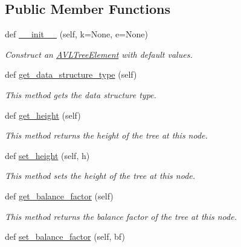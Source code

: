 \subsection*{Public Member Functions}
\begin{DoxyCompactItemize}
\item 
def \mbox{\hyperlink{class_bridges_1_1_a_v_l_tree_element_1_1_a_v_l_tree_element_abe1f188885a526cdaca8eb37d51ca8eb}{\+\_\+\+\_\+init\+\_\+\+\_\+}} (self, k=None, e=None)
\begin{DoxyCompactList}\small\item\em Construct an \mbox{\hyperlink{class_bridges_1_1_a_v_l_tree_element_1_1_a_v_l_tree_element}{A\+V\+L\+Tree\+Element}} with default values. \end{DoxyCompactList}\item 
def \mbox{\hyperlink{class_bridges_1_1_a_v_l_tree_element_1_1_a_v_l_tree_element_a8c53ad7f411645861da9c3d76b5c2a40}{get\+\_\+data\+\_\+structure\+\_\+type}} (self)
\begin{DoxyCompactList}\small\item\em This method gets the data structure type. \end{DoxyCompactList}\item 
def \mbox{\hyperlink{class_bridges_1_1_a_v_l_tree_element_1_1_a_v_l_tree_element_a4c59f5959ed7abd802a80da87322876c}{get\+\_\+height}} (self)
\begin{DoxyCompactList}\small\item\em This method returns the height of the tree at this node. \end{DoxyCompactList}\item 
def \mbox{\hyperlink{class_bridges_1_1_a_v_l_tree_element_1_1_a_v_l_tree_element_a8740bb85a71752e5376873a757d7cb29}{set\+\_\+height}} (self, h)
\begin{DoxyCompactList}\small\item\em This method sets the height of the tree at this node. \end{DoxyCompactList}\item 
def \mbox{\hyperlink{class_bridges_1_1_a_v_l_tree_element_1_1_a_v_l_tree_element_a439aa078880cb15c16fc87be59522947}{get\+\_\+balance\+\_\+factor}} (self)
\begin{DoxyCompactList}\small\item\em This method returns the balance factor of the tree at this node. \end{DoxyCompactList}\item 
def \mbox{\hyperlink{class_bridges_1_1_a_v_l_tree_element_1_1_a_v_l_tree_element_a2c7e78e317705dd02f66438f01acbb39}{set\+\_\+balance\+\_\+factor}} (self, bf)

\end{DoxyCompactItemize}
